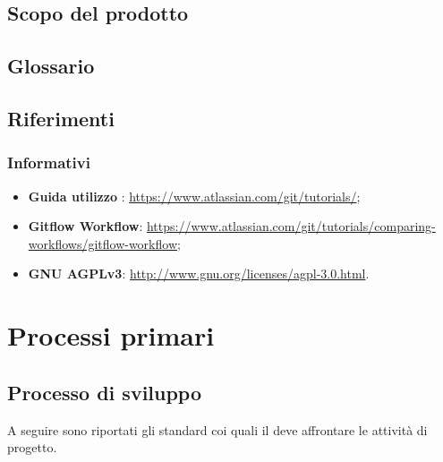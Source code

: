\documentclass[a4paper, titlepage]{article}
\begin{document}
\subsection{Scopo del prodotto}
\SCOPO

\subsection{Glossario}
\GLOSSARIO

\subsection{Riferimenti}


\subsubsection{Informativi}
\begin{itemize}
	\item \textbf{Guida utilizzo }: \url{https://www.atlassian.com/git/tutorials/};
	\item \textbf{Gitflow Workflow}: \url{https://www.atlassian.com/git/tutorials/comparing-workflows/gitflow-workflow};
	\item \textbf{GNU AGPLv3}: \url{http://www.gnu.org/licenses/agpl-3.0.html}.
\end{itemize}

\newpage

\section{Processi primari}

\subsection{Processo di sviluppo}
A seguire sono riportati gli standard coi quali il  deve affrontare le attività di progetto.
\end{document}
